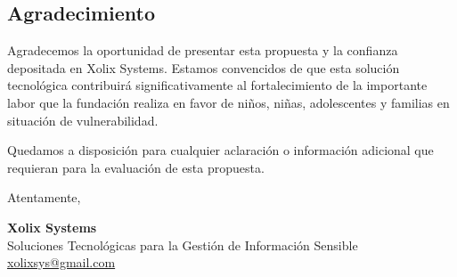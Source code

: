 \documentclass[12pt,letterpaper]{article}
\begin{document}
\subsection{Agradecimiento}

Agradecemos la oportunidad de presentar esta propuesta y la confianza depositada en Xolix Systems. Estamos convencidos de que esta solución tecnológica contribuirá significativamente al fortalecimiento de la importante labor que la fundación realiza en favor de niños, niñas, adolescentes y familias en situación de vulnerabilidad.

Quedamos a disposición para cualquier aclaración o información adicional que requieran para la evaluación de esta propuesta.

\vspace{1cm}

\noindent
Atentamente,

\vspace{1.5cm}

\noindent
\textbf{Xolix Systems}\\
Soluciones Tecnológicas para la Gestión de Información Sensible\\
\href{mailto:xolixsys@gmail.com}{xolixsys@gmail.com}
\end{document}
